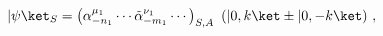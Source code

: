 \begin{equation}
  |\psi \ket_S = \left( \alpha^{\mu_1}_{-n_1}\cdots
  \tilde{\alpha}^{\nu_1}_{-m_1}\cdots \right)_{S,A}~(|0,k\ket
  \pm |0,-k\ket ) \ ,
\end{equation}

